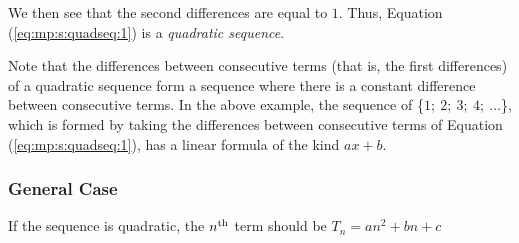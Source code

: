 We then see that the second differences are equal to $1$. Thus, Equation (\ref{eq:mp:s:quadseq:1}) is a \textit{quadratic sequence}. 

Note that the differences between consecutive terms (that is, the first differences) of a quadratic sequence form a sequence where there is a constant difference between consecutive terms. In the above example, the sequence of \{$1; \: 2; \: 3; \: 4; \: \ldots $\}, which is formed by taking the differences between consecutive terms of Equation (\ref{eq:mp:s:quadseq:1}), has a linear formula of the kind $ax+b$. 



\subsubsection{General Case}
If the sequence is quadratic, the $n^{\rm th}$ term should be $T_n = an^2 + bn + c$


